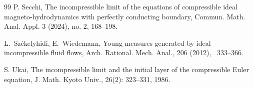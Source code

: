 \documentclass[12pt,reqno]{amsart}
\theoremstyle{definition}
\theoremstyle{remark}
\numberwithin{equation}{section}
\begin{document}
\begin{thebibliography}{99}
P. Secchi, The incompressible limit of the equations of compressible ideal magneto-hydrodynamics with perfectly conducting boundary, Commun. Math. Anal. Appl. 3 (2024), no. 2, 168--198.

{L.~Sz\'{e}kelyhidi, E.~Wiedemann}, { Young measures generated by
  ideal incompressible fluid flows}, Arch. Rational. Mech. Anal., 206 (2012),
  ~333--366.

S. Ukai, The incompressible limit and the initial layer of the compressible Euler equation, J. Math. Kyoto Univ., 26(2): 323--331, 1986.



\end{thebibliography}
\end{document}
